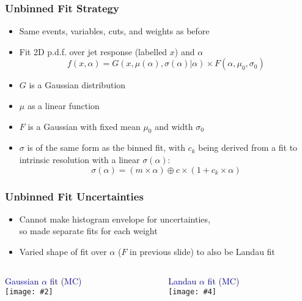 \documentclass{beamer}
\newcommand{\twofigs}[4]{
  \begin{columns}
    \begin{column}{0.5\linewidth}
      \centering
      \textcolor{blue}{#1} \\
      \texttt{[image: \#2]}
    \end{column}
    \begin{column}{0.5\linewidth}
      \centering
      \textcolor{blue}{#3} \\
      \texttt{[image: \#4]}
    \end{column}
  \end{columns}
}
\begin{document}
\begin{frame}
  \frametitle{Unbinned Fit Strategy}

  \begin{itemize}
  \item Same events, variables, cuts, and weights as before
  \item Fit 2D p.d.f. over jet response (labelled $x$) and $\alpha$
  \[
  f(x, \alpha) =
  G(x, \mu(\alpha), \sigma(\alpha)|\alpha)
  \times
  F(\alpha, \mu_0, \sigma_0)
  \]
  \item $G$ is a Gaussian distribution
  \item $\mu$ as a linear function
  \item $F$ is a Gaussian with fixed mean $\mu_0$ and width $\sigma_0$
  \item $\sigma$ is of the same form as the binned fit,
    with $c_k$ being derived from a fit to
    intrinsic resolution with a linear $\sigma(\alpha)$:
  \[
  \sigma(\alpha) = (m \times \alpha) \oplus c \times (1 + c_k \times \alpha)
  \]
  \end{itemize}


\end{frame}


\begin{frame}
  \frametitle{Unbinned Fit Uncertainties}

  \begin{itemize}
  \item Cannot make histogram envelope for uncertainties, \\
    so made separate fits for each weight
  \item Varied shape of fit over $\alpha$ ($F$ in previous slide) to also be Landau fit
  \end{itemize}

  \twofigs{Gaussian $\alpha$ fit (MC)}
          {200121_roofit/Gaussian_xsec_weight_mc.pdf}
          {Landau $\alpha$ fit (MC)}
          {200121_roofit/Landau_xsec_weight_mc.pdf}

\end{frame}
\end{document}
